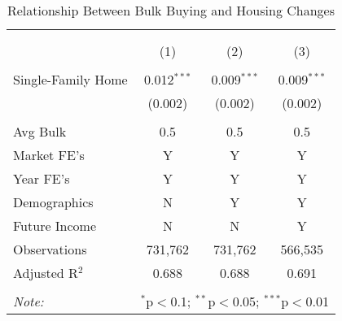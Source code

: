 
\begin{table}[!htbp] \centering 
  \caption{Relationship Between Bulk Buying and Housing Changes} 
  \label{tab:storageCosts} 
\begin{tabular}{@{\extracolsep{5pt}}lccc} 
\\[-1.8ex]\hline 
\hline \\[-1.8ex] 
\\[-1.8ex] & (1) & (2) & (3)\\ 
\hline \\[-1.8ex] 
 Single-Family Home & 0.012$^{***}$ & 0.009$^{***}$ & 0.009$^{***}$ \\ 
  & (0.002) & (0.002) & (0.002) \\ 
 \hline \\[-1.8ex] 
Avg Bulk & 0.5 & 0.5 & 0.5 \\ 
Market FE's & Y & Y & Y \\ 
Year FE's & Y & Y & Y \\ 
Demographics & N & Y & Y \\ 
Future Income & N & N & Y \\ 
Observations & 731,762 & 731,762 & 566,535 \\ 
Adjusted R$^{2}$ & 0.688 & 0.688 & 0.691 \\ 
\hline 
\hline \\[-1.8ex] 
\textit{Note:}  & \multicolumn{3}{l}{$^{*}$p$<$0.1; $^{**}$p$<$0.05; $^{***}$p$<$0.01} \\ 
\end{tabular} 
\end{table} 
